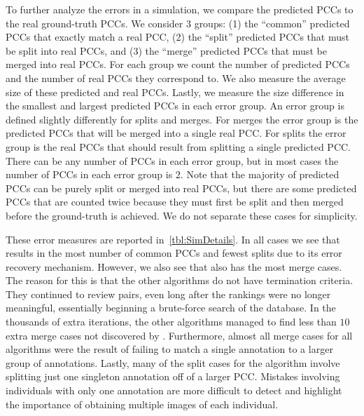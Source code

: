     To further analyze the errors in a simulation, we compare the predicted PCCs to the real ground-truth PCCs.
    We consider $3$ groups:
    (1) the ``common'' predicted PCCs that exactly match a real PCC,
    (2) the ``split'' predicted PCCs that must be split into real PCCs, and
    (3) the ``merge'' predicted PCCs that must be merged into real PCCs.
    For each group we count the number of predicted PCCs and the number of real PCCs they correspond to.
    We also measure the average size of these predicted and real PCCs.
    Lastly, we measure the size difference in the smallest and largest predicted PCCs in each error group.
    An error group is defined slightly differently for splits and merges.
    For merges the error group is the predicted PCCs that will be merged into a single real PCC.
    For splits the error group is the real PCCs that should result from splitting a single predicted PCC.
    There can be any number of PCCs in each error group, but in most cases the number of PCCs in each error group
      is $2$.
    Note that the majority of predicted PCCs can be purely split or merged into real PCCs, but there are some
      predicted PCCs that are counted twice because they must first be split and then merged before the
      ground-truth is achieved.
    We do not separate these cases for simplicity.

    These error measures are reported in~\cref{tbl:SimDetails}.
    In all cases we see that  results in the most number of common PCCs and fewest splits due to its
      error recovery mechanism.
    However, we also see that  also has the most merge cases.
    The reason for this is that the other algorithms do not have termination criteria.
    They continued to review pairs, even long after the rankings were no longer meaningful, essentially beginning
      a brute-force search of the database.
    In the thousands of extra iterations, the other algorithms managed to find less than $10$ extra merge cases
      not discovered by .
    Furthermore, almost all merge cases for all algorithms were the result of failing to match a single
      annotation to a larger group of annotations.
    Lastly, many of the split cases for the  algorithm involve splitting just one singleton
      annotation off of a larger PCC.
    Mistakes involving individuals with only one annotation are more difficult to detect and highlight the
      importance of obtaining multiple images of each individual.

    \SimDetails{}

